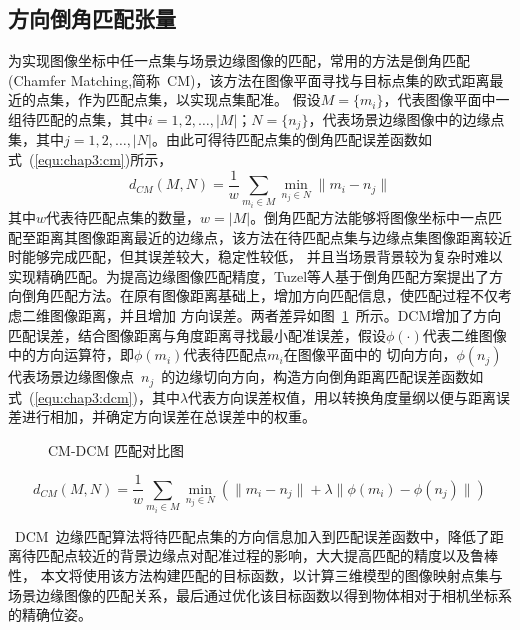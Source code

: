 \subsection{方向倒角匹配张量}
\label{sec:Tensor calculation}
为实现图像坐标中任一点集与场景边缘图像的匹配，常用的方法是倒角匹配(Chamfer Matching,简称~CM)，该方法在图像平面寻找与目标点集的欧式距离最近的点集，作为匹配点集，以实现点集配准。
假设$M=\{m_i\}$，代表图像平面中一组待匹配的点集，其中$i=1,2,\dotsc ,|M|$；$N=\{n_j\}$，代表场景边缘图像中的边缘点集，其中$j=1,2,\dotsc ,|N|$。由此可得待匹配点集的倒角匹配误差函数如式~(\ref{equ:chap3:cm})所示，
\begin{equation}
  \label{equ:chap3:cm}
  d_{CM}(M,N)=\frac{1}{w}\sum_{m_i\in M}\min_{n_j\in N}\lVert {m_i-n_j}\rVert
\end{equation}
其中$w$代表待匹配点集的数量，$w=\lvert M\rvert$。倒角匹配方法能够将图像坐标中一点匹配至距离其图像距离最近的边缘点，该方法在待匹配点集与边缘点集图像距离较近时能够完成匹配，但其误差较大，稳定性较低，
并且当场景背景较为复杂时难以实现精确匹配。为提高边缘图像匹配精度，Tuzel等人\cite{LiuFastDirectionalChamfer2010}基于倒角匹配方案提出了方向倒角匹配方法。在原有图像距离基础上，增加方向匹配信息，使匹配过程不仅考虑二维图像距离，并且增加
方向误差。两者差异如图~\ref{fig:cm_dcm}~所示。DCM增加了方向匹配误差，结合图像距离与角度距离寻找最小配准误差，假设$\phi(\cdot)$代表二维图像中的方向运算符，即$\phi(m_i)$代表待匹配点$m_i$在图像平面中的
切向方向，$\phi(n_j)$代表场景边缘图像点~$n_j$~的边缘切向方向，构造方向倒角距离匹配误差函数如式~(\ref{equ:chap3:dcm})，其中$\lambda$代表方向误差权值，用以转换角度量纲以便与距离误差进行相加，并确定方向误差在总误差中的权重。
\begin{figure}[t] %
  \centering%
  \caption{CM-DCM 匹配对比图}
  \label{fig:cm_dcm}
\end{figure}
\begin{equation}
  \label{equ:chap3:dcm}
  d_{CM}(M,N)=\frac{1}{w}\sum_{m_i\in M}\min_{n_j\in N}(\lVert {m_i-n_j}\rVert+\lambda \lVert{\phi(m_i)-\phi(n_j)}\rVert)
\end{equation}

~DCM~边缘匹配算法将待匹配点集的方向信息加入到匹配误差函数中，降低了距离待匹配点较近的背景边缘点对配准过程的影响，大大提高匹配的精度以及鲁棒性，
本文将使用该方法构建匹配的目标函数，以计算三维模型的图像映射点集与场景边缘图像的匹配关系，最后通过优化该目标函数以得到物体相对于相机坐标系的精确位姿。

